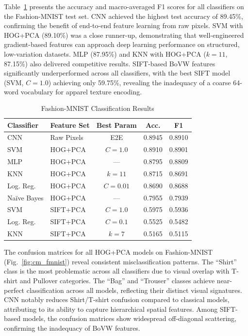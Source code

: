 \documentclass[conference]{IEEEtran}
\begin{document}
Table~\ref{tab:fmnist} presents the accuracy and macro-averaged F1 scores for all classifiers on the Fashion-MNIST test set. CNN achieved the highest test accuracy of 89.45\%, confirming the benefit of end-to-end feature learning from raw pixels. SVM with HOG+PCA (89.10\%) was a close runner-up, demonstrating that well-engineered gradient-based features can approach deep learning performance on structured, low-variation datasets. MLP (87.95\%) and KNN with HOG+PCA ($k=11$, 87.15\%) also delivered competitive results. SIFT-based BoVW features significantly underperformed across all classifiers, with the best SIFT model (SVM, $C=1.0$) achieving only 59.75\%, revealing the inadequacy of a coarse 64-word vocabulary for apparel texture encoding.

\begin{table}[h]
\centering
\caption{Fashion-MNIST Classification Results}
\label{tab:fmnist}
\renewcommand{\arraystretch}{1.2}
\begin{tabular}{llccc}
\toprule
\textbf{Classifier} & \textbf{Feature Set} & \textbf{Best Param} & \textbf{Acc.} & \textbf{F1} \\
\midrule
CNN        & Raw Pixels & E2E    & 0.8945 & 0.8910 \\
SVM        & HOG+PCA    & $C=1.0$  & 0.8910 & 0.8901 \\
MLP        & HOG+PCA    & ---    & 0.8795 & 0.8809 \\
KNN        & HOG+PCA    & $k=11$ & 0.8715 & 0.8691 \\
Log. Reg.  & HOG+PCA    & $C=0.01$ & 0.8690 & 0.8688 \\
Naïve Bayes & HOG+PCA  & ---    & 0.7955 & 0.7939 \\
\midrule
SVM        & SIFT+PCA   & $C=1.0$  & 0.5975 & 0.5936 \\
Log. Reg.  & SIFT+PCA   & $C=0.1$  & 0.5525 & 0.5482 \\
KNN        & SIFT+PCA   & $k=7$  & 0.5165 & 0.5115 \\
\bottomrule
\end{tabular}
\end{table}

The confusion matrices for all HOG+PCA models on Fashion-MNIST (Fig.~\ref{fig:cm_fmnist}) reveal consistent misclassification patterns. The ``Shirt'' class is the most problematic across all classifiers due to visual overlap with T-shirt and Pullover categories. The ``Bag'' and ``Trouser'' classes achieve near-perfect classification across all models, reflecting their distinct visual signatures. CNN notably reduces Shirt/T-shirt confusion compared to classical models, attributing to its ability to capture hierarchical spatial features. Among SIFT-based models, the confusion matrices show widespread off-diagonal scattering, confirming the inadequacy of BoVW features.
\end{document}
